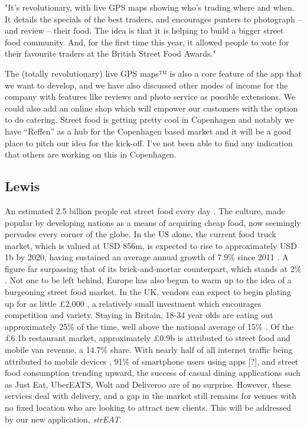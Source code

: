 "It’s revolutionary, with live GPS maps showing who’s trading where and when. It details the specials of the best traders, and encourages punters to photograph – and review – their food. The idea is that it is helping to build a bigger street food community. And, for the first time this year, it allowed people to vote for their favourite traders at the British Street Food Awards." \cite{britishstreetfood}

The (totally revolutionary) live GPS maps™  is also a core feature of the app that we want to develop, and we have also discussed other modes of income for the company with features like reviews and photo service as possible extensions.  We could also add an online shop which will empower our customers with the option to do catering. Street food is getting pretty cool in Copenhagen and notably we have “Reffen” as a hub for the Copenhagen based market and it will be a good place to pitch our idea for the kick-off. I’ve not been able to find any indication that others are working on this in Copenhagen.


\subsection{Lewis}
An estimated 2.5 billion people eat street food every day \cite{Fellows}. The culture, made popular by developing nations as a means of acquiring cheap food, now seemingly pervades every corner of the globe. In the US alone, the current food truck market, which is valued at USD 856m, is expected to rise to approximately USD 1b by 2020, having sustained an average annual growth of 7.9\% since 2011 \cite{The_Economist}. A figure far surpassing that of its brick-and-mortar counterpart, which stands at 2\% \cite{Galatro}. Not one to be left behind, Europe has also begun to warm up to the idea of a burgeoning street food market. In the UK, vendors can expect to begin plating up for as little £2,000 \cite{Rivera}, a relatively small investment which encourages competition and variety. Staying in Britain, 18-34 year olds are eating out approximately 25\% of the time, well above the national average of 15\% \cite{Stenning}. Of the £6.1b restaurant market, approximately £0.9b is attributed to street food and mobile van revenue, a 14.7\% share. With nearly half of all internet traffic being attributed to mobile devices \cite{Panko}, 91\% of smartphone users using apps [?], and street food consumption trending upward, the success of casual dining applications such as Just Eat, UberEATS, Wolt and Deliveroo are of no surprise. However, these services deal with delivery, and a gap in the market still remains for venues with no fixed location who are looking to attract new clients. This will be addressed by our new application, \textit{strEAT}.

